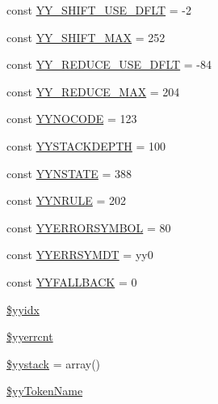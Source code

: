 \begin{DoxyCompactItemize}
\item 
const \hyperlink{class_smarty___internal___templateparser_a90aa463165c0ae2cb3a4b5dc9721144e}{Y\+Y\+\_\+\+S\+H\+I\+F\+T\+\_\+\+U\+S\+E\+\_\+\+D\+F\+L\+T} = -\/2
\item 
const \hyperlink{class_smarty___internal___templateparser_ae00d9e9833807771c3e0b127ff721b11}{Y\+Y\+\_\+\+S\+H\+I\+F\+T\+\_\+\+M\+A\+X} = 252
\item 
const \hyperlink{class_smarty___internal___templateparser_a85522f46f7d2d177a785637737c20af2}{Y\+Y\+\_\+\+R\+E\+D\+U\+C\+E\+\_\+\+U\+S\+E\+\_\+\+D\+F\+L\+T} = -\/84
\item 
const \hyperlink{class_smarty___internal___templateparser_a182aa755ef960d48b8c1cba6e921744b}{Y\+Y\+\_\+\+R\+E\+D\+U\+C\+E\+\_\+\+M\+A\+X} = 204
\item 
const \hyperlink{class_smarty___internal___templateparser_aeb4971986fef5a9cd8e1248f59b07d11}{Y\+Y\+N\+O\+C\+O\+D\+E} = 123
\item 
const \hyperlink{class_smarty___internal___templateparser_af16eacc338babe0d3b328c54aa40b98f}{Y\+Y\+S\+T\+A\+C\+K\+D\+E\+P\+T\+H} = 100
\item 
const \hyperlink{class_smarty___internal___templateparser_af263dc417f5c192408a0950db66de634}{Y\+Y\+N\+S\+T\+A\+T\+E} = 388
\item 
const \hyperlink{class_smarty___internal___templateparser_a2b6a93094d77ff9cc3b5504bd362d6d0}{Y\+Y\+N\+R\+U\+L\+E} = 202
\item 
const \hyperlink{class_smarty___internal___templateparser_a48deb5ab5d7c066e35e660341b0f07ab}{Y\+Y\+E\+R\+R\+O\+R\+S\+Y\+M\+B\+O\+L} = 80
\item 
const \hyperlink{class_smarty___internal___templateparser_a5f0bfec11fd87abbb59a6e234d5616b5}{Y\+Y\+E\+R\+R\+S\+Y\+M\+D\+T} = \textquotesingle{}yy0\textquotesingle{}
\item 
const \hyperlink{class_smarty___internal___templateparser_ad31369d98eca12017f53b9fdd2737127}{Y\+Y\+F\+A\+L\+L\+B\+A\+C\+K} = 0
\item 
\hyperlink{class_smarty___internal___templateparser_aa9941e3de2153c9b66e05e3b11a88c8c}{\$yyidx}
\item 
\hyperlink{class_smarty___internal___templateparser_a439c58ecabc9563ba54aca3735b2fb9d}{\$yyerrcnt}
\item 
\hyperlink{class_smarty___internal___templateparser_a75b70f4a796529f426c8d4d56fb13482}{\$yystack} = array()
\item 
\hyperlink{class_smarty___internal___templateparser_a69b166b21ef45f858ac2e670a299b746}{\$yy\+Token\+Name}
\end{DoxyCompactItemize}
